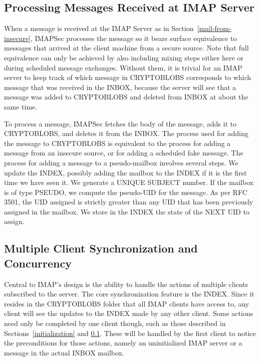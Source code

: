 \documentclass[pageno]{jpaper}
\newcommand{\project}{IMAPSec }
\begin{document}
\subsection{Processing Messages Received at IMAP Server}
\label{processing}

When a message is received at the IMAP Server as in Section~\ref{mail-from-insecure}, \project processes the message so it bears surface equivalence to messages that arrived at the client machine from a secure source. Note that full equivalence can only be achieved by also including mixing steps either here or during scheduled message exchanges. Without them, it is trivial for an IMAP server to keep track of which message in CRYPTOBLOBS corresponds to which message that was received in the INBOX, because the server will see that a message was added to CRYPTOBLOBS and deleted from INBOX at about the same time.

To process a message, \project fetches the body of the message, adds it to CRYPTOBLOBS, and deletes it from the INBOX. The process used for adding the message to CRYPTOBLOBS is equivalent to the process for adding a message from an insecure source, or for adding a scheduled fake message. The process for adding a message to a pseudo-mailbox involves several steps. We update the INDEX, possibly adding the mailbox to the INDEX if it is the first time we have seen it. We generate a UNIQUE SUBJECT number. If the mailbox is of type PSEUDO, we compute the pseudo-UID for the message. As per RFC 3501, the UID assigned is strictly greater than any UID that has been previously assigned in the mailbox. We store in the INDEX the state of the NEXT UID to assign.


\subsection{Multiple Client Synchronization and Concurrency}
Central to IMAP's design is the ability to handle the actions of multiple clients subscribed to the server. The core synchronization feature is the INDEX. Since it resides in the CRYPTOBLOBS folder that all IMAP clients have access to, any client will see the updates to the INDEX made by any other client. Some actions need only be completed by one client though, such as those described in Sections~\ref{initialization} and \ref{processing}. These will be handled by the first client to notice the preconditions for those actions, namely an uninitialized IMAP server or a message in the actual INBOX mailbox.
\end{document}
